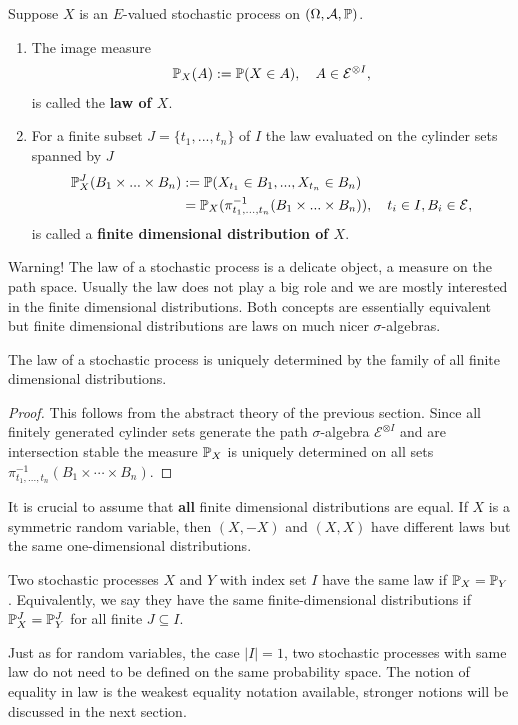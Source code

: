 \begin{ldef}
\begin{deff}\label{def:SP}
		Suppose $X$ is an $E$-valued stochastic process on $(\Omega, \mathcal A, \P)$. 
		\begin{enumerate}[label=(\roman*)]
			\item The image measure 		
		\begin{align*}
			\P_X(A):=\P(X\in A),\quad A\in \mathcal E^{\otimes I},
		\end{align*}
		is called the \textbf{law of $X$}.
		\item For a finite subset $J=\{t_1,...,t_n\}$ of $I$ the law evaluated on the cylinder sets spanned by $J$
		\begin{align*}		
			\P_X^{J}(B_1\times ...\times B_n)&:=\P(X_{t_1}\in B_1,..., X_{t_n}\in B_n)\\
			&=\P_X(\pi_{t_1,...,t_n}^{-1}(B_1\times ... \times B_n)),\quad t_i\in I, B_i\in \mathcal E,
		\end{align*}
		is called a \textbf{finite dimensional distribution of $X$}.
	\end{enumerate}
\end{deff}
\end{ldef}
Warning! The law of a stochastic process is a delicate object, a measure on the path space. Usually the law does not play a big role and we are mostly interested in the finite dimensional distributions. Both concepts are essentially equivalent but finite dimensional distributions are laws on much nicer $\sigma$-algebras.
\begin{llemma}
\begin{prop}
		The law of a stochastic process is uniquely determined by the family of all finite dimensional distributions.
\end{prop}
\end{llemma}
\begin{proof}[Proof]
	This follows from the abstract theory of the previous section. Since all finitely generated cylinder sets generate the path $\sigma$-algebra $\mathcal E^{\otimes I}$ and are intersection stable the measure $\P_X$ is uniquely determined on all sets $\pi_{t_1,...,t_n}^{-1}(B_1\times \cdots \times B_n)$.
\end{proof}
It is crucial to assume that \textbf{all} finite dimensional distributions are equal. If $X$ is a symmetric random variable, then $(X,-X)$ and $(X,X)$ have different laws but the same one-dimensional distributions.
\begin{ldef}
\begin{deff}
	Two stochastic processes $X$ and $Y$ with index set $I$ have the same law if $\P_X=\P_Y$. Equivalently, we say they have the same finite-dimensional distributions if $\P_X^J=\P_Y^J$ for all finite $J\subseteq I$.
\end{deff}
\end{ldef}
Just as for random variables, the case $|I|=1$, two stochastic processes with same law do not need to be defined on the same probability space. The notion of equality in law is the weakest equality notation available, stronger notions will be discussed in the next section. \smallskip

